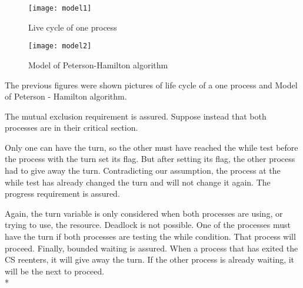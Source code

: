 \begin{figure}[h!]
\centering
\texttt{[image: model1]}
\caption{Live cycle of one process}
\label{fig:model1}
\end{figure}

\begin{figure}[!ht]
\centering
\texttt{[image: model2]}
\caption{Model of Peterson-Hamilton algorithm}
\label{fig:model2}
\end{figure}

The previous figures were shown pictures of life cycle of a one process and Model of Peterson - Hamilton algorithm.

The mutual exclusion requirement is assured. Suppose instead that both processes are in their critical section. 

Only one can have the turn, so the other must have reached the while test before the process with the turn set its flag. 
But after setting its flag, the other process had to give away the turn. 
Contradicting our assumption, the process at the while test has already changed the turn and will not change it again.
	The progress requirement is assured. 
	
	Again, the turn variable is only considered when both processes are using, or trying to use, the resource.
	Deadlock is not possible. One of the processes must have the turn if both processes are testing the while condition. 
	That process will proceed.
	Finally, bounded waiting is assured. When a process that has exited the CS reenters, it will give away the turn. 
	If the other process is already waiting, it will be the next to proceed.\\*

